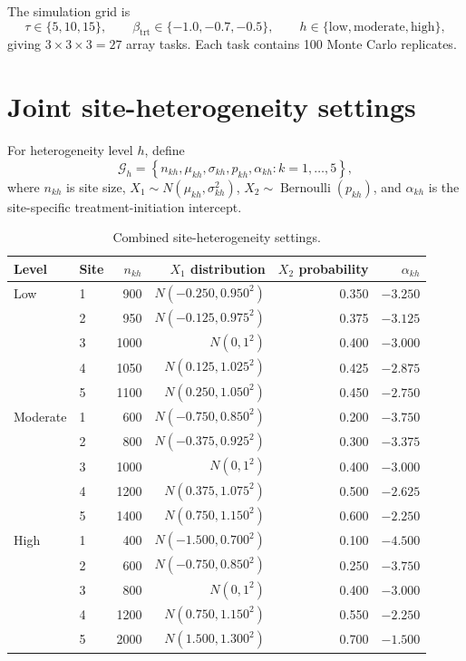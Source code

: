\documentclass[11pt]{article}
\begin{document}
The simulation grid is
\[
  \tau\in\{5,10,15\},\qquad
  \beta_{\mathrm{trt}}\in\{-1.0,-0.7,-0.5\},\qquad
  h\in\{\text{low},\text{moderate},\text{high}\},
\]
giving $3\times3\times3=27$ array tasks. Each task contains 100 Monte Carlo
replicates.

\section{Joint site-heterogeneity settings}

For heterogeneity level $h$, define
\[
  \mathcal G_h
  =\left\{n_{kh},\mu_{kh},\sigma_{kh},p_{kh},\alpha_{kh}:
            k=1,\ldots,5\right\},
\]
where $n_{kh}$ is site size, $X_1\sim N(\mu_{kh},\sigma_{kh}^2)$,
$X_2\sim\operatorname{Bernoulli}(p_{kh})$, and $\alpha_{kh}$ is the
site-specific treatment-initiation intercept.

\begin{table}[ht]
\centering
\small
\caption{Combined site-heterogeneity settings.}
\begin{tabular}{llrrrr}
\toprule
Level & Site & $n_{kh}$ & $X_1$ distribution & $X_2$ probability & $\alpha_{kh}$ \\
\midrule
Low & 1 & 900  & $N(-0.250,0.950^2)$ & 0.350 & $-3.250$ \\
    & 2 & 950  & $N(-0.125,0.975^2)$ & 0.375 & $-3.125$ \\
    & 3 & 1000 & $N(0,1^2)$          & 0.400 & $-3.000$ \\
    & 4 & 1050 & $N(0.125,1.025^2)$  & 0.425 & $-2.875$ \\
    & 5 & 1100 & $N(0.250,1.050^2)$  & 0.450 & $-2.750$ \\
\addlinespace
Moderate & 1 & 600  & $N(-0.750,0.850^2)$ & 0.200 & $-3.750$ \\
         & 2 & 800  & $N(-0.375,0.925^2)$ & 0.300 & $-3.375$ \\
         & 3 & 1000 & $N(0,1^2)$          & 0.400 & $-3.000$ \\
         & 4 & 1200 & $N(0.375,1.075^2)$  & 0.500 & $-2.625$ \\
         & 5 & 1400 & $N(0.750,1.150^2)$  & 0.600 & $-2.250$ \\
\addlinespace
High & 1 & 400  & $N(-1.500,0.700^2)$ & 0.100 & $-4.500$ \\
     & 2 & 600  & $N(-0.750,0.850^2)$ & 0.250 & $-3.750$ \\
     & 3 & 800  & $N(0,1^2)$          & 0.400 & $-3.000$ \\
     & 4 & 1200 & $N(0.750,1.150^2)$  & 0.550 & $-2.250$ \\
     & 5 & 2000 & $N(1.500,1.300^2)$  & 0.700 & $-1.500$ \\
\bottomrule
\end{tabular}
\end{table}
\end{document}
